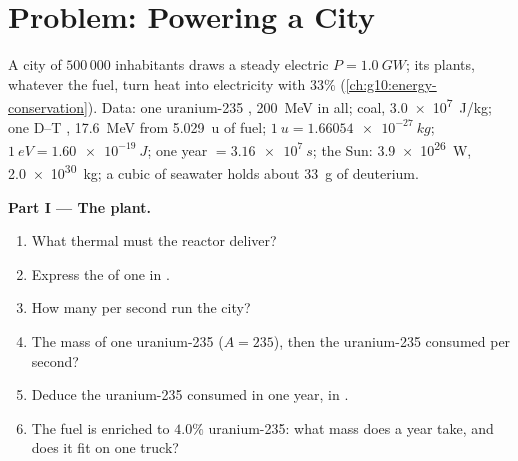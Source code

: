 \section{Problem: Powering a City}

\begin{problem}
\label{pb:g12:nuclear-energy:1}
A city of $500\,000$ inhabitants draws a steady electric 
$P = \qty{1.0}{GW}$; its plants, whatever the fuel, turn heat into
electricity with  $33\%$ (\cref{ch:g10:energy-conservation}).
Data: one uranium-235 , \qty{200}{MeV} in all; coal, \qty{3.0e7}{J/kg};
one D--T , \qty{17.6}{MeV} from \qty{5.029}{u} of fuel;
$\qty{1}{u} = \qty{1.66054e-27}{kg}$; $\qty{1}{eV} = \qty{1.60e-19}{J}$; one
year $= \qty{3.16e7}{s}$; the Sun: \qty{3.9e26}{W}, \qty{2.0e30}{kg}; a cubic
 of seawater holds about \qty{33}{g} of deuterium.

\medskip
\noindent\textbf{Part I --- The  plant.}
\begin{enumerate}
  \item What thermal  must the reactor deliver?
  \item Express the  of one  in .
  \item How many  per second run the city?
  \item The mass of one uranium-235  ($A = 235$), then the uranium-235
        consumed per second?
  \item Deduce the uranium-235 consumed in one year, in .
  \item The fuel is enriched to $4.0\%$ uranium-235: what mass does a year
        take, and does it fit on one truck?
\end{enumerate}


\end{problem}

